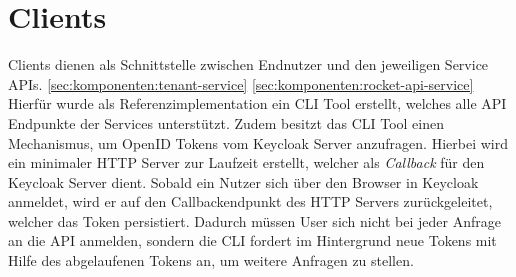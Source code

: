 \section{Clients}
\label{sec:komponenten:clients}

Clients dienen als Schnittstelle zwischen Endnutzer und den jeweiligen Service APIs. 
\ref{sec:komponenten:tenant-service} \ref{sec:komponenten:rocket-api-service}
Hierfür wurde als Referenzimplementation ein \ac{CLI} Tool erstellt, welches alle API Endpunkte der Services
unterstützt. Zudem besitzt das CLI Tool einen Mechanismus, um OpenID Tokens vom Keycloak Server anzufragen.
Hierbei wird ein minimaler HTTP Server zur Laufzeit erstellt, welcher als \emph{Callback} für den Keycloak Server dient.
Sobald ein Nutzer sich über den Browser in Keycloak anmeldet, wird er auf den Callbackendpunkt des HTTP Servers
zurückgeleitet, welcher das Token persistiert. Dadurch müssen User sich nicht bei jeder Anfrage an die API 
anmelden, sondern die CLI fordert im Hintergrund neue Tokens mit Hilfe des abgelaufenen Tokens an,
um weitere Anfragen zu stellen.